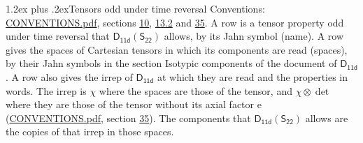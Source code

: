 \documentclass[10pt,a4paper]{article}
\makeatletter
\renewcommand\section{\@startsection{section}{1}{\z@}{-3ex plus -1ex minus -.2ex}%
  {1.2ex plus .2ex}{\normalfont\large\sffamily\bfseries\color{parttitle}}}
\numberwithin{equation}{section}
\newcommand{\grp}[1]{\mathsf{#1}}
\newcommand{\irrprod}{\otimes}
\makeatother
\begin{document}
\section{Tensors odd under time reversal}\label{s:time_odd}
Conventions: \href{../../CONVENTIONS.pdf}{CONVENTIONS.pdf}, sections \href{../../../rotation/CONVENTIONS.pdf\#conv.10}{10}, \href{../../../rotation/CONVENTIONS.pdf\#conv.13.2}{13.2} and \href{../../CONVENTIONS.pdf\#conv.35}{35}.
\leavevmode\label{n:head.name.property}A row is a tensor property odd under time reversal that $\grp{D_{11d}}(\grp{S_{22}})$ allows, by its Jahn symbol (name). \label{n:head.spaces}A row gives the spaces of Cartesian tensors in which its components are read (spaces), by their Jahn symbols in the section Isotypic components of the document of \href{../../../rotation/data/pdf/D11d.pdf}{$\grp{D_{11d}}$}. \label{n:head.properties}A row also gives the irrep of $\grp{D_{11d}}$ at which they are read and the properties in words. The irrep is $\chi$ where the spaces are those of the tensor, and $\chi \irrprod \det$ where they are those of the tensor without its axial factor e (\href{../../CONVENTIONS.pdf}{CONVENTIONS.pdf}, section \href{../../CONVENTIONS.pdf\#conv.35}{35}). The components that $\grp{D_{11d}}(\grp{S_{22}})$ allows are the copies of that irrep in those spaces.
\end{document}
